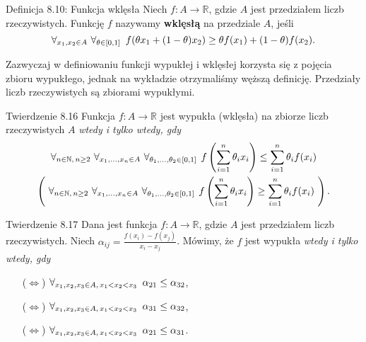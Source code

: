 \documentclass{article}
\newcommand{\hquad}{\mkern9mu}
\newcommand{\R}{\mathbb{R}}
\newcommand{\N}{\mathbb{N}}
\newcommand{\ifff}{\Leftrightarrow}
\begin{document}
\begin{defr}{Definicja 8.10: Funkcja wklęsła}
    Niech $f:A\to\R$, gdzie $A$ jest przedziałem liczb rzeczywistych. Funkcję $f$ nazywamy \textbf{wklęsłą} na przedziale $A$, jeśli 
    \begin{equation*}
        \forall_{x_1,x_2\in A}\ \forall_{\theta\in[0,1]}\hquad f(\theta x_1+(1-\theta)x_2)\ge\theta f(x_1)+(1-\theta)f(x_2).
    \end{equation*}
\end{defr}

Zazwyczaj w definiowaniu funkcji wypukłej i wklęsłej korzysta się z pojęcia zbioru wypukłego, jednak na wykładzie otrzymaliśmy węższą definicję. Przedziały liczb rzeczywistych są zbiorami wypukłymi.

\begin{twier}{Twierdzenie 8.16}
    Funkcja $f:A\to\R$ jest wypukła (wklęsła) na zbiorze liczb rzeczywistych $A$ \textit{wtedy i tylko wtedy, gdy}
    \begin{gather*}
        \forall_{n\in\N,\, n\ge2}\ \forall_{x_1,\dots,x_n\in A}\ \forall_{\theta_1,\dots,\theta_2\in[0,1]\hquad }f\left(\sum_{i=1}^{n}{\theta_{i}x_{i}}\right)\le\sum_{i=1}^{n}{\theta_{i}f(x_{i})}\\
        \left(\ \forall_{n\in\N,\, n\ge2}\ \forall_{x_1,\dots,x_n\in A}\ \forall_{\theta_1,\dots,\theta_2\in[0,1]\hquad } f\left(\sum_{i=1}^{n}{\theta_{i}x_{i}}\right)\ge\sum_{i=1}^{n}{\theta_{i}f(x_{i})}\ \right).
    \end{gather*}
\end{twier}

\begin{twier}{Twierdzenie 8.17}
    Dana jest funkcja $f:A\to\R$, gdzie $A$ jest przedziałem liczb rzeczywistych. Niech $\alpha_{ij}=\frac{f(x_i)-f(x_j)}{x_i-x_j}$. Mówimy, że $f$ jest wypukła \textit{wtedy i tylko wtedy, gdy}
    \begin{itemize}
        \item[($\ifff$)] $\forall_{x_1,x_2,x_3\in A,\,x_1<x_2<x_3}\hquad \alpha_{21}\le\alpha_{32}$,
        \item[($\ifff$)] $\forall_{x_1,x_2,x_3\in A,\,x_1<x_2<x_3}\hquad \alpha_{31}\le\alpha_{32}$,
        \item[($\ifff$)] $\forall_{x_1,x_2,x_3\in A,\,x_1<x_2<x_3}\hquad \alpha_{21}\le\alpha_{31}$.
    \end{itemize}
\end{twier}
\end{document}
